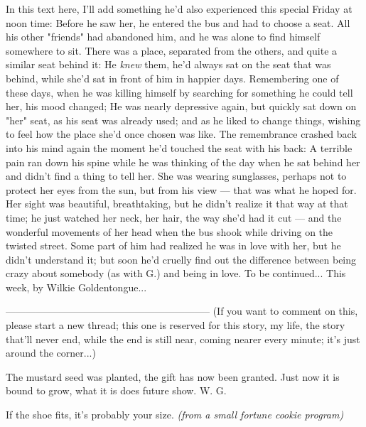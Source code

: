 In this text here, I'll add something he'd also experienced this special Friday at noon time: Before he saw her, he entered the bus and had to choose a seat. All his other "friends" had abandoned him, and he was alone to find himself somewhere to sit. There was a place, separated from the others, and quite a similar seat behind it: He \emph{knew} them, he'd always sat on the seat that was behind, while she'd sat in front of him in happier days. Remembering one of these days, when he was killing himself by searching for something he could tell her, his mood changed; He was nearly depressive again, but quickly sat down on "her" seat, as his seat was already used; and as he liked to change things, wishing to feel how the place she'd once chosen was like. The remembrance crashed back into his mind again the moment he'd touched the seat with his back: A terrible pain ran down his spine while he was thinking of the day when he sat behind her and didn't find a thing to tell her. She was wearing sunglasses, perhaps not to protect her eyes from the sun, but from his view --- that was what he hoped for. Her sight was beautiful, breathtaking, but he didn't realize it that way at that time; he just watched her neck, her hair, the way she'd had it cut --- and the wonderful movements of her head when the bus shook while driving on the twisted street. Some part of him had realized he was in love with her, but he didn't understand it; but soon he'd cruelly find out the difference between being crazy about somebody (as with G.) and being in love. 
To be continued...
This week, by Wilkie Goldentongue...

--------------------------------------------------------------
(If you want to comment on this, please start a new thread; this one is reserved for this story, my life, the story that'll never end, while the end is still near, coming nearer every minute; it's just around the corner...)

The mustard seed was planted,
the gift has now been granted. 
Just now it is bound to grow,
what it is does future show.
W. G. 

If the shoe fits, it's probably your size.
\emph{(from a small fortune cookie program)}
